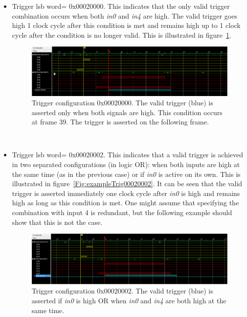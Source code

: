 \begin{itemize}
    \item Trigger \gls{lsb} word= 0x00020000. This indicates that the only valid trigger combination occurs when both \emph{in0} and \emph{in4} are high. The valid trigger goes high 1 clock cycle after this condition is met and remains high up to 1 clock cycle after the condition is no longer valid. This is illustrated in figure~\ref{Fig:exampleTrig00020000}.
        \begin{figure}
            \centering
            \includegraphics[width=.90\textwidth]{./Images/Trigger0x00020000.png}
            \caption{Trigger configuration 0x00020000. The valid trigger (blue) is asserted only when both signals are high. This condition occurs at frame 39. The trigger is asserted on the following frame.}
            \label{Fig:exampleTrig00020000}
        \end{figure}\\
    \item Trigger \gls{lsb} word= 0x00020002. This indicates that a valid trigger is achieved in two separated configurations (in logic OR): when both inputs are high at the same time (as in the previous case) or if \emph{in0} is active on its own. This is illustrated in figure~\ref{Fig:exampleTrig00020002}. It can be seen that the valid trigger is asserted immediately one clock cycle after \emph{in0} is high and remains high as long as this condition is met. One might assume that specifying the combination with input 4 is redundant, but the following example should show that this is not the case.
        \begin{figure}
            \centering
            \includegraphics[width=.90\textwidth]{./Images/Trigger0x00020002.png}
            \caption{Trigger configuration 0x00020002. The valid trigger (blue) is asserted if \emph{in0} is high OR when \emph{in0} and \emph{in4} are both high at the same time.}

\end{figure}
\end{itemize}

